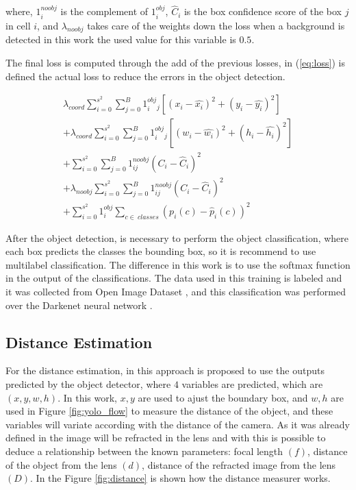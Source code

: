 where, $1^{noobj}_i$ is the complement of $1^{obj}_i$, $\hat{C}_i$ is the box confidence score of the box $j$ in cell $i$, and $\lambda_{noobj}$ takes care of the weights down the loss when a background is detected in this work the used value for this variable is $0.5$. 

The final loss is computed through the add of the previous losses, in (\ref{eq:loss}) is defined the actual loss to reduce the errors in the object detection.

\begin{equation}
\label{eq:loss}
\begin{aligned}
    \lambda_{coord}\sum_{i=0}^{s^2}\sum_{j=0}^{B}1^{obj}_i_j\left [ \left ( x_i - \hat{x_i} \right )^2  + (y_i-\hat{y_i})^2 \right ] \\ 
    + \lambda_{coord}\sum_{i=0}^{s^2}\sum_{j=0}^{B}1^{obj}_i_j\left [ \left ( w_i - \hat{w_i} \right )^2  + (h_i-\hat{h_i})^2 \right ] \\
+    \sum_{i=0}^{s^2}\sum_{j=0}^{B}1^{noobj}_{ij}\left ( C_i - \hat{C}_i \right )^2\\
+  \lambda_{noobj}\sum_{i=0}^{s^2}\sum_{j=0}^{B}1^{noobj}_{ij}\left ( C_i - \hat{C}_i \right )^2\\
+     \sum_{i=0}^{s^2}1^{obj}_i \sum_{c\in~classes} \left ( p_i\left ( c \right )-\hat{p}_i\left ( c \right )\right )^2
    \end{aligned}
\end{equation}

After the object detection, is necessary to perform the object classification, where each box predicts the classes the bounding box, so it is recommend to use multilabel classification. The difference in this work is to use the softmax function in the output of the classifications. The data used in this training is labeled and it was collected from Open Image Dataset \cite{krasin2017openimages}, and this classification was performed over the Darkenet neural network \cite{redmon2013darknet}.

\subsection{Distance Estimation}

For the distance estimation, in this approach is proposed to use the outputs predicted by the object detector, where $4$ variables are predicted, which are $(x, y, w, h)$. In this work, $x,y$ are used to ajust the boundary box, and $w, h$ are used in Figure \ref{fig:yolo_flow} to measure the distance of the object, and these variables will variate according with the distance of the camera. As it was already defined in \cite{cao2013circle} the image will be refracted in the lens and with this is possible to deduce a relationship between the known parameters: focal length $(f)$, distance of the object from the lens $(d)$, distance of the refracted image from the lens $(D)$. In the Figure \ref{fig:distance} is shown how the distance measurer works. 


